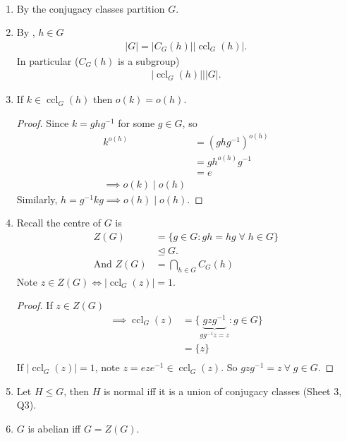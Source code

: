 \begin{remark} ~
    \begin{enumerate}
        \item By  the conjugacy classes partition $G$.
        \item By , $h \in G$
        \begin{align*}
            |G| = |C_G(h)| |\operatorname{ccl}_G(h)|.
        \end{align*} 
        In particular ($C_G(h)$ is a subgroup)
        \begin{align*}
            |\operatorname{ccl}_G(h)| \mathbin{\bigg|} |G|.
        \end{align*} 
        \item If $k \in \operatorname{ccl}_G(h)$ then $o(k) = o(h)$.
        \begin{proof}
            Since $k = ghg^{-1}$ for some $g \in G$, so
        \begin{align*}
            k^{o(h)} &= (ghg^{-1})^{o(h)} \\
            &= g h^{o(h)} g^{-1} \\
            &= e \\
            \implies o(k) \mid o(h)
        \end{align*} 
        Similarly, $h = g^{-1} k g \implies o(h) \mid o(h)$.
        \end{proof} 
        \item \label{conjugacy-4}
        Recall the centre of $G$ is
        \begin{align*}
            Z(G) &= \{g \in G : gh = hg \; \forall \; h \in G\} \\
            &\trianglelefteq G. \\
            \text{And } Z(G) &= \bigcap_{h \in G} C_G(h)
        \end{align*} 
        Note $z \in Z(G) \iff |\operatorname{ccl}_G(z)| = 1$.
        \begin{proof}
            If $z \in Z(G)$
            \begin{align*}
                \implies \operatorname{ccl}_G(z) &= \{ \underbrace{gzg^{-1}}_{gg^{-1} z = z} : g \in G\} \\
                &= \{z\} \\
            \end{align*} 
            If $|\operatorname{ccl}_G(z)| = 1$, note $z = e z e^{-1} \in \operatorname{ccl}_G(z)$.
            So $gzg^{-1} = z \ \forall \; g \in G$.
        \end{proof} 
        \item Let $H \leq G$, then $H$ is normal iff it is a union of conjugacy classes (Sheet 3, Q3).
        \item $G$ is abelian iff $G = Z(G)$.
    \end{enumerate} 
\end{remark} 

